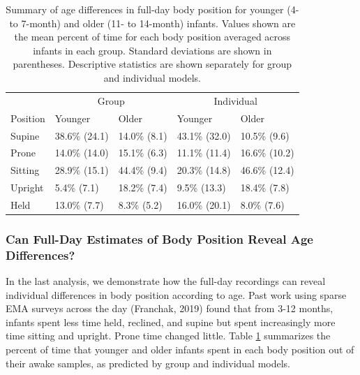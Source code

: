 \documentclass[
  man]{apa6}
\begin{document}
\begin{table}[tbp]

\begin{center}
\begin{threeparttable}

\caption{\label{tab:agetable}Summary of age differences in full-day body position for younger (4- to 7-month) and older (11- to 14-month) infants. Values shown are the mean percent of time for each body position averaged across infants in each group. Standard deviations are shown in parentheses. Descriptive statistics are shown separately for group and individual models.}

\begin{tabular}{lllll}
\toprule
 & \multicolumn{2}{c}{Group} & \multicolumn{2}{c}{Individual} \\
\cmidrule(r){2-3} \cmidrule(r){4-5}
Position & Younger & Older & Younger & Older\\
\midrule
Supine & 38.6\% (24.1) & 14.0\% (8.1) & 43.1\% (32.0) & 10.5\% (9.6)\\
Prone & 14.0\% (14.0) & 15.1\% (6.3) & 11.1\% (11.4) & 16.6\% (10.2)\\
Sitting & 28.9\% (15.1) & 44.4\% (9.4) & 20.3\% (14.8) & 46.6\% (12.4)\\
Upright & 5.4\% (7.1) & 18.2\% (7.4) & 9.5\% (13.3) & 18.4\% (7.8)\\
Held & 13.0\% (7.7) & 8.3\% (5.2) & 16.0\% (20.1) & 8.0\% (7.6)\\
\bottomrule
\end{tabular}

\end{threeparttable}
\end{center}

\end{table}

\hypertarget{can-full-day-estimates-of-body-position-reveal-age-differences}{%
\subsubsection{Can Full-Day Estimates of Body Position Reveal Age Differences?}\label{can-full-day-estimates-of-body-position-reveal-age-differences}}

In the last analysis, we demonstrate how the full-day recordings can reveal individual differences in body position according to age. Past work using sparse EMA surveys across the day (Franchak, 2019) found that from 3-12 months, infants spent less time held, reclined, and supine but spent increasingly more time sitting and upright. Prone time changed little. Table \ref{tab:agetable} summarizes the percent of time that younger and older infants spent in each body position out of their awake samples, as predicted by group and individual models.
\end{document}
